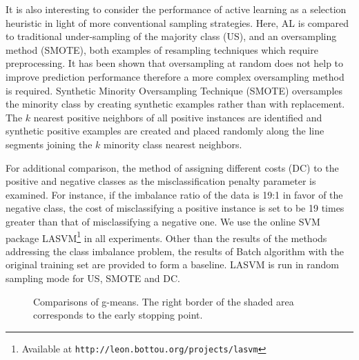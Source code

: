 It is also interesting to consider the performance of active learning as a selection heuristic in light of more conventional sampling strategies. Here, AL is compared to traditional under-sampling of the majority class (US), and an oversampling method (SMOTE), both examples of resampling techniques which require preprocessing. It has been shown that oversampling at random does not help to improve prediction performance \cite{Japkowicz_2002} therefore a more complex oversampling method is required.  Synthetic Minority Oversampling Technique (SMOTE) oversamples the minority class by creating synthetic examples rather than with replacement. The $k$ nearest positive neighbors of all positive instances are identified and synthetic positive examples are created and placed randomly along the line segments joining the $k$ minority class nearest neighbors.


For additional comparison, the method of assigning different costs (DC) to the positive and negative classes as the misclassification penalty parameter is examined. For instance, if the imbalance ratio of the data is 19:1 in favor of the negative class, the cost of misclassifying a positive instance is set to be 19 times greater than that of misclassifying a negative one. We use the online SVM package LASVM\footnote{Available at \texttt{http://leon.bottou.org/projects/lasvm}} in all experiments. Other than the results of the methods addressing the class imbalance problem, the results of Batch algorithm with the original training set are provided to form a baseline. LASVM is run in random sampling mode for US, SMOTE and DC.

\begin{figure}[t!]
    \hspace{-5mm}
    \caption{Comparisons of g-means. The right border of the shaded area corresponds to the early stopping point.}
    \label{eightgraphs}
\end{figure}


